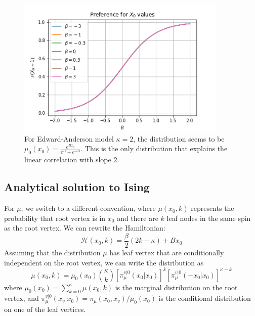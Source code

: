 \documentclass[12pt]{article}
\begin{document}
\begin{figure}[h]
    \centering
    \includegraphics[width=10cm]{img/EA_x0_B.png}
    \caption{For Edward-Anderson model $\kappa=2$, the distribution seems to be $\mu_0(x_0) = \frac{e^{Bx_0}}{e^{B} + e^{-B}}$. This is the only
    distribution that explains the linear correlation with slope $2$. }
    \label{Fig.EA-x0-B-logisitic}
\end{figure}

\newpage
\subsection{Analytical solution to Ising}

For $\mu$, we switch to a different convention, where $\mu(x_0, k)$ represents the probability that root vertex is in $x_0$ and there are
$k$ leaf nodes in the same spin as the root vertex.
We can rewrite the Hamiltonian:
\begin{equation*}
    \mathcal{H}(x_0, k) = \frac\beta2(2k-\kappa) + Bx_0
\end{equation*}
Assuming that the distribution $\mu$ has leaf vertex that are conditionally independent on the root vertex, we can write the distribution as
\begin{equation*}
    \mu(x_0, k) = \mu_0(x_0){\kappa \choose k}\left[\pi_\mu^{v|0}(x_0|x_0)\right]^k\left[\pi_\mu^{v|0}(-x_0|x_0)\right]^{\kappa - k}
\end{equation*}
where $\mu_0(x_0)=\sum_{k=0}^\kappa \mu(x_0, k)$ is the marginal distribution on the root vertex, and
$\pi_\mu^{v|0}(x_v|x_0) = \pi_\mu(x_0, x_v) / \mu_0(x_0)$ is the conditional distribution on one of the leaf vertices.
\end{document}
